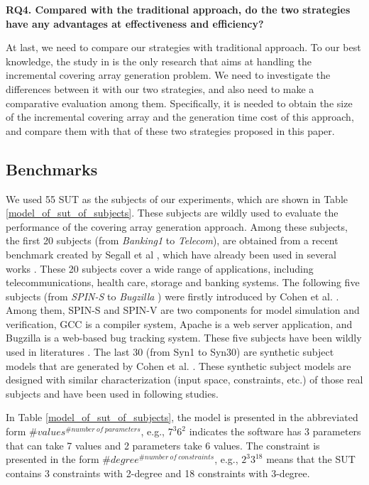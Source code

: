 \documentclass[conference]{IEEEtran}
\theoremstyle{definition}
\begin{document}
\textbf{RQ4. Compared with the traditional approach, do the two strategies have any advantages at effectiveness and efficiency?}

At last, we need to compare our strategies with traditional approach. To our best knowledge, the study in \cite{fouche2009incremental} is the only research that aims at handling the incremental covering array generation problem. We need to investigate the differences between it with our two strategies, and also need to make a comparative evaluation among them. Specifically, it is needed to obtain the size of the incremental covering array and the generation time cost of this approach, and compare them with that of these two strategies proposed in this paper.


\subsection{Benchmarks}
We used 55 SUT as the subjects of our experiments, which are shown in Table \ref{model_of_sut_of_subjects}. These subjects are wildly used to evaluate the performance of the covering array generation approach. Among these subjects, the first 20 subjects (from \emph{Banking1} to \emph{Telecom}), are obtained from a recent benchmark created by Segall et al \cite{segall2011using}, which have already been used in several works \cite{jia2015learning,choi2016distance}. These 20 subjects cover a wide range of applications, including telecommunications, health care, storage and banking systems.  The following five subjects (from \emph{SPIN-S}  to \emph{Bugzilla} ) were firstly introduced by Cohen et al. \cite{cohen2007interaction,cohen2008constructing}. Among them, SPIN-S and SPIN-V are two components for model simulation and verification, GCC is a compiler system, Apache is a web server application, and Bugzilla is a web-based bug tracking system. These five subjects have been wildly used in literatures \cite{kuhn2006pseudo,cohen2007interaction,cohen2008constructing,garvin2009improved,garvin2011evaluating,lin2015tca,choi2016distance}. The last 30 (from Syn1 to Syn30) are synthetic subject models that are generated by Cohen et al. \cite{cohen2008constructing}. These synthetic subject models are designed with similar characterization (input space, constraints, etc.) of those real subjects and have been used in following studies\cite{garvin2009improved,garvin2011evaluating,lin2015tca,choi2016distance}.

In Table \ref{model_of_sut_of_subjects}, the model is presented in the abbreviated form $\#values^{\#number\ of\ parameters}$, e.g., $7^{3}6^{2}$ indicates the software has 3 parameters that can take 7 values and 2 parameters take 6 values.  The constraint is presented in the form $\#degree^{\#number\ of\ constraints}$, e.g., $2^{3}3^{18}$ means that the SUT contains 3 constraints with  2-degree and 18 constraints with 3-degree.
\end{document}
